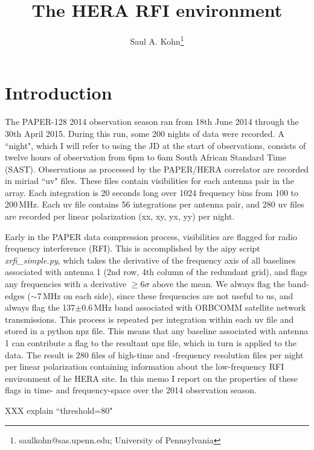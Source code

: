 \documentclass[10pt,a4paper]{article}
\title{The HERA RFI environment}
\author{Saul A. Kohn\thanks{saulkohn@sas.upenn.edu; University of Pennsylvania}}
\begin{document}
\maketitle


\section{Introduction}

The PAPER-128 2014 observation season ran from 18th June 2014 through the 30th April 2015. During this run, some 200 nights of data were recorded. A ``night", which I will refer to using the JD at the start of observations, consists of twelve hours of observation from 6pm to 6am South African Standard Time (SAST). Observations as processed by the PAPER/HERA correlator are recorded in {\sc miriad} ``uv" files. These files contain visibilities for each antenna pair in the array. Each integration is 20 seconds long over 1024 frequency bins from 100 to 200\,MHz. Each uv file contains 56 integrations per antenna pair, and  280 uv files are recorded per linear polarization (xx, xy, yx, yy) per night.


Early in the PAPER data compression process, visibilities are flagged for radio frequency interference (RFI). This is accomplished by the {\sc aipy} script \textit{xrfi\_simple.py}, which takes the derivative of the frequency axis of all baselines associated with antenna 1 (2nd row, 4th column of the redundant grid), and flags any frequencies with a derivative $\geqslant 6\sigma$ above the mean. We always flag the band-edges ($\sim$7\,MHz on each side), since these frequencies are not useful to us, and always flag the 137$\pm$0.6\,MHz band associated with ORBCOMM satellite network transmissions. This process is repeated per integration within each uv file and stored in a {\sc python} npz file. This means that any baseline associated with antenna 1 can contribute a flag to the resultant npz file, which in turn is applied to the data. The result is 280 files of high-time and -frequency resolution files per night per linear polarization containing information about the low-frequency RFI environment of he HERA site. In this memo I report on the properties of these flags in time- and frequency-space over the 2014 observation season.

XXX explain ``threshold=80"
\end{document}
